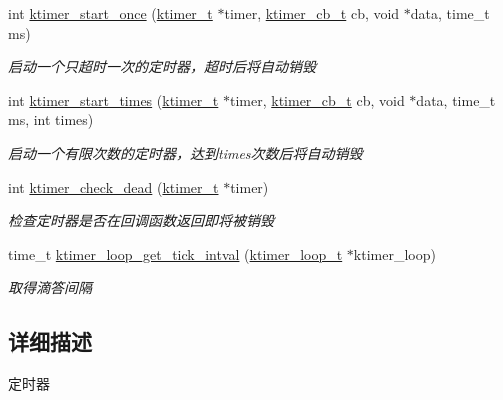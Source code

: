 \begin{DoxyCompactItemize}
int \hyperlink{a00143_ga9c37409260a72e3218ae4fcaf44d79bc_ga9c37409260a72e3218ae4fcaf44d79bc}{ktimer\+\_\+start\+\_\+once} (\hyperlink{a00066_a846172ea4e8a86449eca41a3d8e074b7_a846172ea4e8a86449eca41a3d8e074b7}{ktimer\+\_\+t} $\ast$timer, \hyperlink{a00066_a2333fd0f2c3a85faf586300ca40deed4_a2333fd0f2c3a85faf586300ca40deed4}{ktimer\+\_\+cb\+\_\+t} cb, void $\ast$data, time\+\_\+t ms)
\begin{DoxyCompactList}\small\item\em 启动一个只超时一次的定时器，超时后将自动销毁 \end{DoxyCompactList}\item 
int \hyperlink{a00143_ga285936846760d9f325e588d2e2105fe5_ga285936846760d9f325e588d2e2105fe5}{ktimer\+\_\+start\+\_\+times} (\hyperlink{a00066_a846172ea4e8a86449eca41a3d8e074b7_a846172ea4e8a86449eca41a3d8e074b7}{ktimer\+\_\+t} $\ast$timer, \hyperlink{a00066_a2333fd0f2c3a85faf586300ca40deed4_a2333fd0f2c3a85faf586300ca40deed4}{ktimer\+\_\+cb\+\_\+t} cb, void $\ast$data, time\+\_\+t ms, int times)
\begin{DoxyCompactList}\small\item\em 启动一个有限次数的定时器，达到times次数后将自动销毁 \end{DoxyCompactList}\item 
int \hyperlink{a00143_ga9387b99ff760183fe8b61c8c46d6efc8_ga9387b99ff760183fe8b61c8c46d6efc8}{ktimer\+\_\+check\+\_\+dead} (\hyperlink{a00066_a846172ea4e8a86449eca41a3d8e074b7_a846172ea4e8a86449eca41a3d8e074b7}{ktimer\+\_\+t} $\ast$timer)
\begin{DoxyCompactList}\small\item\em 检查定时器是否在回调函数返回即将被销毁 \end{DoxyCompactList}\item 
time\+\_\+t \hyperlink{a00143_ga71282c2dc8bac0935617b1271f4066e6_ga71282c2dc8bac0935617b1271f4066e6}{ktimer\+\_\+loop\+\_\+get\+\_\+tick\+\_\+intval} (\hyperlink{a00066_a024af2aa29615e7a811ea6c45438157d_a024af2aa29615e7a811ea6c45438157d}{ktimer\+\_\+loop\+\_\+t} $\ast$ktimer\+\_\+loop)
\begin{DoxyCompactList}\small\item\em 取得滴答间隔 \end{DoxyCompactList}\end{DoxyCompactItemize}


\subsection{详细描述}
定时器 


